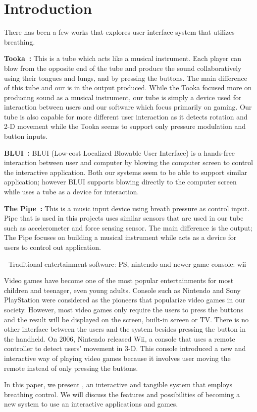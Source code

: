 \section{Introduction}\label{sec:intro}

There has been a few works that explores user interface system that utilizes breathing.

\textbf{Tooka~\cite{tooka}:} This is a tube which acts like a musical instrument. Each player can blow from the opposite end of the tube and produce the sound collaboratively using their tongues and lungs, and by pressing the buttons. The main difference of this tube and our \tube is in the output produced. While the Tooka focused more on producing sound as a musical instrument, our tube is simply a device used for interaction between users and our software which focus primarily on gaming. Our tube is also capable for more different user interaction as it detects rotation and 2-D movement while the Tooka seems to support only pressure modulation and button inputs.

\textbf{BLUI~\cite{blui}:} BLUI (Low-cost Localized Blowable User Interface) is a hands-free interaction between user and computer by blowing the computer screen to control the interactive application. Both our systems seem to be able to support similar application; however BLUI supports blowing directly to the computer screen while \tube uses a tube as a device for interaction.

\textbf{The Pipe~\cite{thepipe}:} This is a music input device using breath pressure as control input. Pipe that is used in this projects uses similar sensors that are used in our tube such as accelerometer and force sensing sensor. The main difference is the output; The Pipe focuses on building a musical instrument while \tube acts as a device for users to control out application.

\TODO
- Traditional entertainment software: PS, nintendo and newer game console: wii

Video games have become one of the most popular entertainments for most children and teenager, even young adults. Console such as Nintendo and Sony PlayStation were considered as the pioneers that popularize video games in our society. However, most video games only require the users to press the buttons and the result will be displayed on the screen, built-in screen or TV. There is no other interface between the users and the system besides pressing the button in the handheld. On 2006, Nintendo released Wii, a console that uses a remote controller to detect users’ movement in 3-D. This console introduced a new and interactive way of playing video games because it involves user moving the remote instead of only pressing the buttons. 

In this paper, we present \tube, an interactive and tangible system that employs breathing control. We will discuss the features and possibilities of \tube becoming a new system to use an interactive applications and games.
